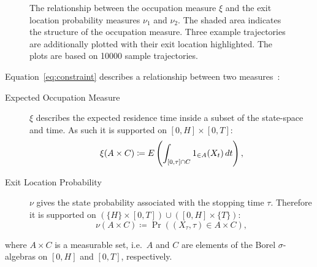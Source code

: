 \begin{example}
\begin{figure}[htb]
    \caption[Occupation measure $\xi$ and
    exit location probability measures $\nu_1$ and $\nu_2$]{The
      relationship between the occupation measure $\xi$ and the
      exit location probability measures $\nu_1$ and $\nu_2$. The
      shaded area indicates
      the structure of the occupation measure. Three example trajectories are
      additionally plotted with
      their exit location highlighted. The plots are based on
    \num{10000} sample trajectories.}
    \label{fig:decomposition}
  \end{figure}
\end{example}

Equation~\eqref{eq:constraint}  describes a relationship between
two measures~\parencite[][Chapter~9.2]{lasserre2010moments}:
\begin{description}
  \item[Expected Occupation Measure] $\xi$ describes the expected
    residence time inside a subset of the state-space and time. As
    such it is supported on $[0,H]\times [0,T]$:
    \begin{equation}\label{eq:ex_occ_measure}
      \xi(A\times C) \coloneqq {E}\left(\int_{[0,\tau]\cap {C}}{1}_{\in A}(X_t)\,dt\right),
    \end{equation}
  \item [Exit Location Probability] $\nu$ gives the state probability
    associated with the stopping time $\tau$. Therefore it is
    supported on $(\{H\}\times[0,T]) \cup
    ([0,H]\times\{T\})$:
    \begin{equation}\label{eq:exit_loc_measure}
      \nu(A\times C)\coloneqq \Pr((X_{\tau},\tau)\in A\times C),
    \end{equation}
\end{description}
where $A\times C$ is a measurable set, i.e.\ $A$ and $C$ are elements
of the Borel $\sigma$-algebras on $[0,H]$ and $[0,T]$, respectively.


